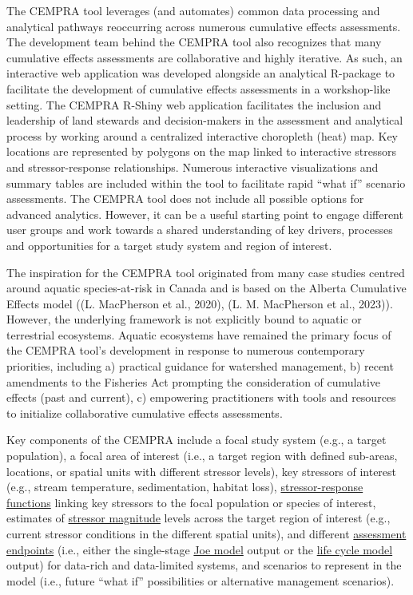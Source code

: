 \documentclass[
  letterpaper,
  DIV=11,
  numbers=noendperiod]{scrreprt}
\begin{document}
The CEMPRA tool leverages (and automates) common data processing and
analytical pathways reoccurring across numerous cumulative effects
assessments. The development team behind the CEMPRA tool also recognizes
that many cumulative effects assessments are collaborative and highly
iterative. As such, an interactive web application was developed
alongside an analytical R-package to facilitate the development of
cumulative effects assessments in a workshop-like setting. The CEMPRA
R-Shiny web application facilitates the inclusion and leadership of land
stewards and decision-makers in the assessment and analytical process by
working around a centralized interactive choropleth (heat) map. Key
locations are represented by polygons on the map linked to interactive
stressors and stressor-response relationships. Numerous interactive
visualizations and summary tables are included within the tool to
facilitate rapid ``what if'' scenario assessments. The CEMPRA tool does
not include all possible options for advanced analytics. However, it can
be a useful starting point to engage different user groups and work
towards a shared understanding of key drivers, processes and
opportunities for a target study system and region of interest.

The inspiration for the CEMPRA tool originated from many case studies
centred around aquatic species-at-risk in Canada and is based on the
Alberta Cumulative Effects model ((L. MacPherson et al., 2020), (L. M.
MacPherson et al., 2023)). However, the underlying framework is not
explicitly bound to aquatic or terrestrial ecosystems. Aquatic
ecosystems have remained the primary focus of the CEMPRA tool's
development in response to numerous contemporary priorities, including
a) practical guidance for watershed management, b) recent amendments to
the Fisheries Act prompting the consideration of cumulative effects
(past and current), c) empowering practitioners with tools and resources
to initialize collaborative cumulative effects assessments.

Key components of the CEMPRA include a focal study system (e.g., a
target population), a focal area of interest (i.e., a target region with
defined sub-areas, locations, or spatial units with different stressor
levels), key stressors of interest (e.g., stream temperature,
sedimentation, habitat loss),
\href{02_stressor_response.qmd}{stressor-response functions} linking key
stressors to the focal population or species of interest, estimates of
\href{05_data_inputs.qmd}{stressor magnitude} levels across the target
region of interest (e.g., current stressor conditions in the different
spatial units), and different
\href{03_pathways_endpoints.qmd}{assessment endpoints} (i.e., either the
single-stage \href{06_r_shiny_app.qmd}{Joe model} output or the
\href{07_life_cycle_model.qmd}{life cycle model} output) for data-rich
and data-limited systems, and scenarios to represent in the model (i.e.,
future ``what if'' possibilities or alternative management scenarios).
\end{document}
